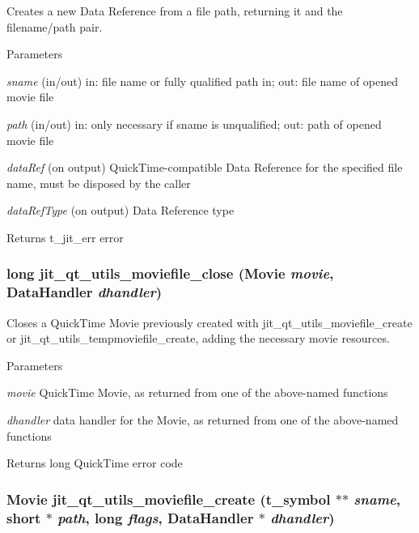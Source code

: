 Creates a new Data Reference from a file path, returning it and the filename/path pair. 
\begin{DoxyParams}{Parameters}
\item[{\em sname}](in/out) in: file name or fully qualified path in; out: file name of opened movie file \item[{\em path}](in/out) in: only necessary if sname is unqualified; out: path of opened movie file \item[{\em dataRef}](on output) QuickTime-\/compatible Data Reference for the specified file name, must be disposed by the caller \item[{\em dataRefType}](on output) Data Reference type\end{DoxyParams}
\begin{DoxyReturn}{Returns}
t\_\-jit\_\-err error 
\end{DoxyReturn}
\hypertarget{group__qtutilsmod_ga24fc912da9fe5279095b21265968a364}{
\subsubsection[{jit\_\-qt\_\-utils\_\-moviefile\_\-close}]{\setlength{\rightskip}{0pt plus 5cm}long jit\_\-qt\_\-utils\_\-moviefile\_\-close (Movie {\em movie}, \/  DataHandler {\em dhandler})}}
\label{group__qtutilsmod_ga24fc912da9fe5279095b21265968a364}


Closes a QuickTime Movie previously created with jit\_\-qt\_\-utils\_\-moviefile\_\-create or jit\_\-qt\_\-utils\_\-tempmoviefile\_\-create, adding the necessary movie resources. 
\begin{DoxyParams}{Parameters}
\item[{\em movie}]QuickTime Movie, as returned from one of the above-\/named functions \item[{\em dhandler}]data handler for the Movie, as returned from one of the above-\/named functions\end{DoxyParams}
\begin{DoxyReturn}{Returns}
long QuickTime error code 
\end{DoxyReturn}
\hypertarget{group__qtutilsmod_gaf3595ef272a7b42709d9463973b9b932}{
\subsubsection[{jit\_\-qt\_\-utils\_\-moviefile\_\-create}]{\setlength{\rightskip}{0pt plus 5cm}Movie jit\_\-qt\_\-utils\_\-moviefile\_\-create ({\bf t\_\-symbol} $\ast$$\ast$ {\em sname}, \/  short $\ast$ {\em path}, \/  long {\em flags}, \/  DataHandler $\ast$ {\em dhandler})}}
\label{group__qtutilsmod_gaf3595ef272a7b42709d9463973b9b932}


